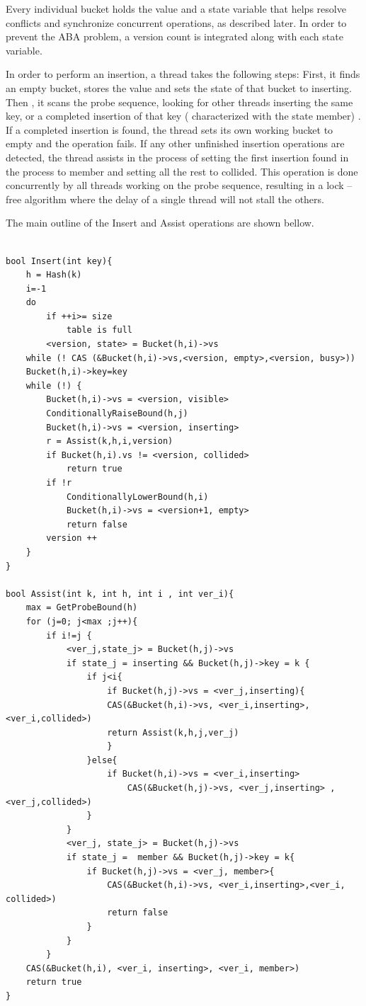 Every individual bucket holds the value and a state variable that helps resolve conflicts and synchronize concurrent operations, as described later. In order to prevent the ABA  problem, a version count is integrated along with each state variable.

In order to perform an insertion, a thread takes the following steps: First, it finds an empty bucket, stores the value and sets the state of that bucket to inserting. Then , it scans the probe sequence, looking for other threads inserting the same key, or a completed insertion of that key  ( characterized with the state member) . If a completed insertion is found, the thread sets its own working bucket to empty and the operation fails. If any other unfinished insertion operations are detected, the thread assists in the process of setting the first insertion found in the process to member and setting all the rest to collided. This operation is done concurrently by all threads working on the probe sequence, resulting in a lock –free algorithm where the delay of a single thread will not stall the others.

The main outline of the Insert and Assist operations are shown bellow.

\begin{lstlisting}

bool Insert(int key){
	h = Hash(k)
	i=-1
	do
		if ++i>= size 
			table is full
		<version, state> = Bucket(h,i)->vs
	while (! CAS (&Bucket(h,i)->vs,<version, empty>,<version, busy>))
	Bucket(h,i)->key=key
	while (!) {
		Bucket(h,i)->vs = <version, visible>
		ConditionallyRaiseBound(h,j)
		Bucket(h,i)->vs = <version, inserting>
		r = Assist(k,h,i,version)
		if Bucket(h,i).vs != <version, collided>
			return true
		if !r
			ConditionallyLowerBound(h,i)
			Bucket(h,i)->vs = <version+1, empty>
			return false
		version ++
	}
}

bool Assist(int k, int h, int i , int ver_i){
	max = GetProbeBound(h)
	for (j=0; j<max ;j++){
		if i!=j {
			<ver_j,state_j> = Bucket(h,j)->vs
			if state_j = inserting && Bucket(h,j)->key = k {
				if j<i{
					if Bucket(h,j)->vs = <ver_j,inserting){
					CAS(&Bucket(h,i)->vs, <ver_i,inserting>, <ver_i,collided>)
					return Assist(k,h,j,ver_j)
					}
				}else{
					if Bucket(h,i)->vs = <ver_i,inserting>
						CAS(&Bucket(h,j)->vs, <ver_j,inserting> ,<ver_j,collided>)
				}
			}
			<ver_j, state_j> = Bucket(h,j)->vs
			if state_j =  member && Bucket(h,j)->key = k{
				if Bucket(h,j)->vs = <ver_j, member>{
					CAS(&Bucket(h,i)->vs, <ver_i,inserting>,<ver_i, collided>)
					return false
				}
			}
		}
	CAS(&Bucket(h,i), <ver_i, inserting>, <ver_i, member>)
	return true
}

					
						
\end{lstlisting}

